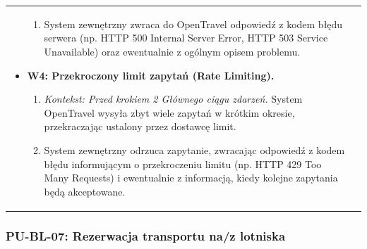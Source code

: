 \documentclass[a4paper,12pt]{article}
\begin{document}
\begin{longtable}{|p{\pierwszakolumnaszerokoscPUBLDane}|p{\drugakolumnaszerokoscPUBLDane}|}
\begin{itemize}
\begin{enumerate}
                    \item System zewnętrzny zwraca do OpenTravel odpowiedź z kodem błędu serwera (np. HTTP 500 Internal Server Error, HTTP 503 Service Unavailable) oraz ewentualnie z ogólnym opisem problemu.
                \end{enumerate}
            \item \textbf{W4: Przekroczony limit zapytań (Rate Limiting).}
                \begin{enumerate} \itemsep0pt \parskip0pt \parsep0pt
                    \item \textit{Kontekst: Przed krokiem 2 Głównego ciągu zdarzeń.} System OpenTravel wysyła zbyt wiele zapytań w krótkim okresie, przekraczając ustalony przez dostawcę limit.
                    \item System zewnętrzny odrzuca zapytanie, zwracając odpowiedź z kodem błędu informującym o przekroczeniu limitu (np. HTTP 429 Too Many Requests) i ewentualnie z informacją, kiedy kolejne zapytania będą akceptowane.
                \end{enumerate}
        \end{itemize} \\
\end{longtable}
\endgroup

\subsubsection{PU-BL-07: Rezerwacja transportu na/z lotniska}

\begingroup %
\small %
\renewcommand{\arraystretch}{1.2} %

\newlength{\pierwszakolumnaszerokoscPUBLRezTransLot}
\setlength{\pierwszakolumnaszerokoscPUBLRezTransLot}{4.0cm}

\newlength{\drugakolumnaszerokoscPUBLRezTransLot}
\setlength{\drugakolumnaszerokoscPUBLRezTransLot}{\dimexpr\textwidth-\pierwszakolumnaszerokoscPUBLRezTransLot-2\tabcolsep-3\arrayrulewidth\relax}
\end{document}
